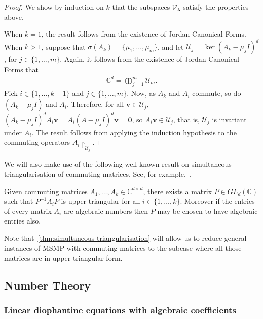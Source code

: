 \documentclass[format=acmsmall, review=false, screen=true]{acmart}
\newcommand{\Complex}{\mathbb{C}}
\newcommand{\myvector}{\boldsymbol}
\begin{document}
\begin{proof}
We show by induction on $k$ that the subspaces
$\mathcal{V}_{\myvector{\lambda}}$ satisfy the properties above.

When $k = 1$, the result follows from the existence of Jordan Canonical Forms. When $k > 1$, suppose that $\sigma(A_{k}) = \lbrace \mu_{1}, \ldots, \mu_{m} \rbrace$, and let $\mathcal{U}_{j} = \ker{(A_{k} - \mu_{j} I)}^{d}$, for $j \in \lbrace 1, \ldots, m \rbrace$. Again, it follows from the existence of Jordan Canonical Forms that
\begin{align*}
\Complex^{d} = \bigoplus \limits_{j = 1}^{m} \mathcal{U}_{m} .
\end{align*}
Pick $i \in \lbrace 1, \ldots, k-1 \rbrace$ and $j \in \lbrace 1,
\ldots, m \rbrace$. Now, as $A_{k}$ and $A_{i}$ commute, so do
$(A_{k}-\mu_{j} I)$ and $A_{i}$. Therefore, for all $\myvector{v} \in
\mathcal{U}_{j}$, ${(A_{k} - \mu_{j} I)}^{d} A_{i} \myvector{v} =
A_{i} {(A-\mu_{j} I)}^{d} \myvector{v} = \myvector{0}$, so $A_{i}
\myvector{v} \in \mathcal{U}_{j}$, that is, $\mathcal{U}_{j}$ is
invariant under $A_{i}$. The result follows from applying the
induction hypothesis to the commuting operators $A_{i}
\restriction_{\mathcal{U}_{j}}$.
\end{proof}

We will also make use of the following well-known result on simultaneous triangularisation of commuting matrices. See, for example,~\cite{CommutingMatrices}.

\begin{theorem}
\label{thm:simultaneous-triangularisation}
Given commuting matrices $A_{1}, \ldots, A_{k} \in \Complex^{d
  \times d}$, there exists a matrix $P \in \mathit{GL}_{d}(\Complex)$
such that $P^{-1}A_{i}P$ is upper triangular for all $i \in \lbrace 1,
\ldots, k \rbrace$.  Moreover if the entries of every matrix $A_i$ are
algebraic numbers then $P$ may be chosen to have algebraic entries
also.
\end{theorem}

Note that~\cref{thm:simultaneous-triangularisation} will allow us to
reduce general instances of MSMP with commuting matrices to the
subcase where all those matrices are in upper triangular form.

\subsection{Number Theory}

\subsubsection{Linear diophantine equations with algebraic coefficients}
\label{sec:ant}
\end{document}
